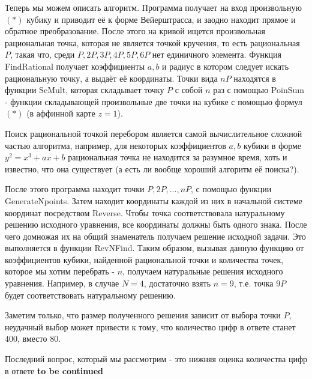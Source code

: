 Теперь мы можем описать алгоритм. Программа получает на вход произвольную \((*)\)
кубику и приводит её к форме Вейерштрасса, и заодно находит прямое и обратное
преобразование. После этого на кривой ищется произвольная рациональная точка,
которая не является точкой кручения, то есть  рациональная \(P\), такая что,
среди \(P, 2P, 3P, 4P, 5P, 6P\) нет единичного элемента. Функция FindRational получает
коэффициенты \(a, b\) и радиус в котором следует искать рациональную точку,  а
выдаёт её координаты. Точки вида \(nP\) находятся в функции \textsf{ScMult}, которая
складывает точку \(P\) с собой \(n\) раз с помощью \textsf{PoinSum} - функции складывающей
произвольные две точки на кубике с помощью формул  \((*)\) (в аффинной карте \(z =
1\)).

\begin{remark}
    Поиск рациональной точкой перебором является самой вычислительное
    сложной частью алгоритма, например, для некоторых коэффициентов \(a, b\) кубики в
    форме \(y^2 = x^3 + ax + b\) рациональная точка не находится за разумное
    время, хоть и известно, что она существует (а есть ли вообще хороший алгоритм 
    её поиска?). 
\end{remark}

После этого программа находит точки \(P, 2P, ... , nP\), с помощью функции
\textsf{GenerateNpoints}. Затем находит координаты каждой из них в начальной системе
координат посредством Reverse. Чтобы точка соответствовала натуральному
решению исходного уравнения, все координаты должны быть одного знака. После
чего домножая их на общий знаменатель получаем решение исходной задачи. Это
выполняется в функции \textsf{RevNFind}. Таким образом, вызывая данную функцию от
коэффициентов кубики, найденной рациональной точки и  количества точек,
которое мы хотим перебрать - \(n\), получаем натуральные решения исходного
уравнения. Например, в случае \(N = 4\), достаточно взять \(n = 9\), т.е.
точка \(9P\) будет соответствовать натуральному решению.
 
Заметим только, что размер полученного решения зависит от выбора точки \(P\),
неудачный выбор может привести к тому, что количество цифр в ответе станет
\(400\), вместо \(80\).

Последний вопрос, который мы рассмотрим - это нижняя оценка количества цифр в
ответе \textbf{to be continued}

